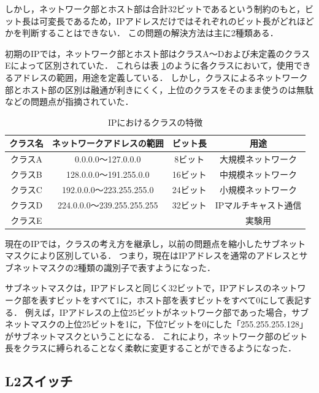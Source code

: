 しかし，ネットワーク部とホスト部は合計32ビットであるという制約のもと，ビット長は可変長であるため，IPアドレスだけではそれぞれのビット長がどれほどかを判断することはできない．
この問題の解決方法は主に2種類ある．

初期のIPでは，ネットワーク部とホスト部はクラスA～Dおよび未定義のクラスEによって区別されていた．
これらは表 \ref{tab:2-3}のように各クラスにおいて，使用できるアドレスの範囲，用途を定義している．
しかし，クラスによるネットワーク部とホスト部の区別は融通が利きにくく，上位のクラスをそのまま使うのは無駄などの問題点が指摘されていた．

\begin{table}[tb]
	\begin{center}
		\caption{IPにおけるクラスの特徴}
		\begin{tabular}{c|c|c|c}
			\hline \hline
			クラス名 & ネットワークアドレスの範囲 & ビット長 & 用途　\\ \hline
			クラスA & 0.0.0.0～127.0.0.0 & 8ビット & 大規模ネットワーク\\
			クラスB & 128.0.0.0～191.255.0.0 & 16ビット & 中規模ネットワーク \\
			クラスC & 192.0.0.0～223.255.255.0 & 24ビット & 小規模ネットワーク \\
			クラスD & 224.0.0.0～239.255.255.255 & 32ビット & IPマルチキャスト通信\\
			クラスE & & & 実験用　\\ \hline
		\end{tabular}
		\label{tab:2-3}
	\end{center}
\end{table}

現在のIPでは，クラスの考え方を継承し，以前の問題点を縮小したサブネットマスクにより区別している．
つまり，現在はIPアドレスを通常のアドレスとサブネットマスクの2種類の識別子で表すようになった．

サブネットマスクは，IPアドレスと同じく32ビットで，IPアドレスのネットワーク部を表すビットをすべて1に，ホスト部を表すビットをすべて0にして表記する．
例えば，IPアドレスの上位25ビットがネットワーク部であった場合，サブネットマスクの上位25ビットを1に，下位7ビットを0にした「255.255.255.128」がサブネットマスクということになる．
これにより，ネットワーク部のビット長をクラスに縛られることなく柔軟に変更することができるようになった．

\subsection{L2スイッチ}


